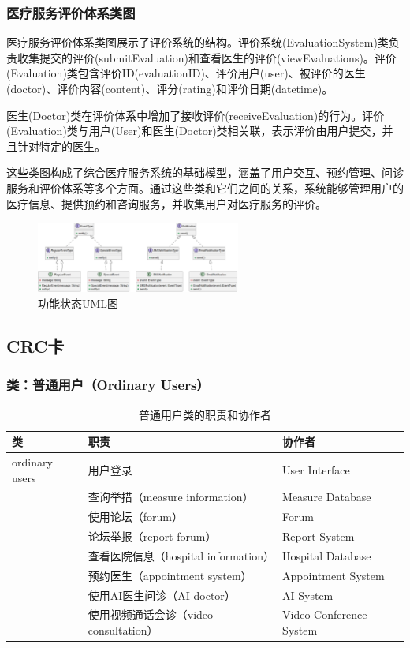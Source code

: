 \subsubsection{医疗服务评价体系类图}
医疗服务评价体系类图展示了评价系统的结构。评价系统(EvaluationSystem)类负责收集提交的评价(submitEvaluation)和查看医生的评价(viewEvaluations)。评价(Evaluation)类包含评价ID(evaluationID)、评价用户(user)、被评价的医生(doctor)、评价内容(content)、评分(rating)和评价日期(datetime)。

医生(Doctor)类在评价体系中增加了接收评价(receiveEvaluation)的行为。评价(Evaluation)类与用户(User)和医生(Doctor)类相关联，表示评价由用户提交，并且针对特定的医生。

这些类图构成了综合医疗服务系统的基础模型，涵盖了用户交互、预约管理、问诊服务和评价体系等多个方面。通过这些类和它们之间的关系，系统能够管理用户的医疗信息、提供预约和咨询服务，并收集用户对医疗服务的评价。
\begin{figure}[htbp]
	\centering
	\includegraphics[width=0.6\textwidth]{figures/07.png}
	\caption{功能状态UML图}
	\label{fig:functional_state_diagram}
\end{figure}

\subsection{CRC卡}
\subsubsection{类：普通用户（Ordinary Users）}
\begin{table}[htbp]
	\centering
	\begin{tabular}{|l|l|l|}
		\hline
		\textbf{类} & \textbf{职责} & \textbf{协作者} \\
		\hline
		ordinary users & 用户登录 & User Interface \\
		& 查询举措（measure information） & Measure Database \\
		& 使用论坛（forum） & Forum \\
		& 论坛举报（report forum） & Report System \\
		& 查看医院信息（hospital information） & Hospital Database \\
		& 预约医生（appointment system） & Appointment System \\
		& 使用AI医生问诊（AI doctor） & AI System \\
		& 使用视频通话会诊（video consultation） & Video Conference System \\
		\hline
	\end{tabular}
	\caption{普通用户类的职责和协作者}
	\label{tab:ordinary_users}
\end{table}

